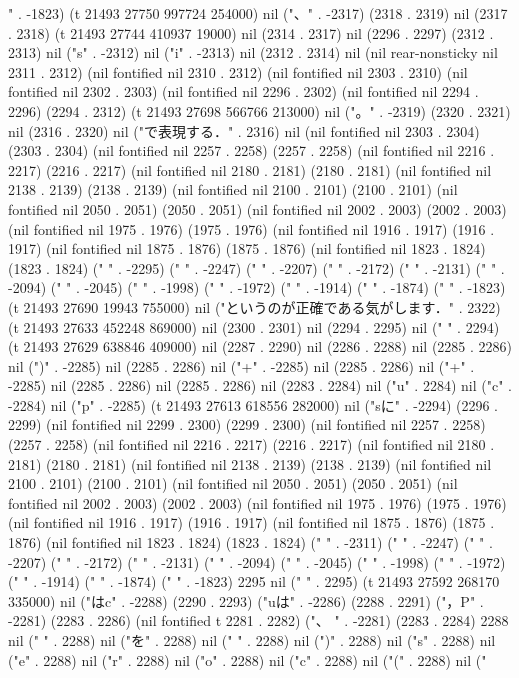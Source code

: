 " . -1823) (t 21493 27750 997724 254000) nil ("、" . -2317) (2318 . 2319) nil (2317 . 2318) (t 21493 27744 410937 19000) nil (2314 . 2317) nil (2296 . 2297) (2312 . 2313) nil ("s" . -2312) nil ("i" . -2313) nil (2312 . 2314) nil (nil rear-nonsticky nil 2311 . 2312) (nil fontified nil 2310 . 2312) (nil fontified nil 2303 . 2310) (nil fontified nil 2302 . 2303) (nil fontified nil 2296 . 2302) (nil fontified nil 2294 . 2296) (2294 . 2312) (t 21493 27698 566766 213000) nil ("。" . -2319) (2320 . 2321) nil (2316 . 2320) nil ("で表現する．" . 2316) nil (nil fontified nil 2303 . 2304) (2303 . 2304) (nil fontified nil 2257 . 2258) (2257 . 2258) (nil fontified nil 2216 . 2217) (2216 . 2217) (nil fontified nil 2180 . 2181) (2180 . 2181) (nil fontified nil 2138 . 2139) (2138 . 2139) (nil fontified nil 2100 . 2101) (2100 . 2101) (nil fontified nil 2050 . 2051) (2050 . 2051) (nil fontified nil 2002 . 2003) (2002 . 2003) (nil fontified nil 1975 . 1976) (1975 . 1976) (nil fontified nil 1916 . 1917) (1916 . 1917) (nil fontified nil 1875 . 1876) (1875 . 1876) (nil fontified nil 1823 . 1824) (1823 . 1824) ("
" . -2295) ("
" . -2247) ("
" . -2207) ("
" . -2172) ("
" . -2131) ("
" . -2094) ("
" . -2045) ("
" . -1998) ("
" . -1972) ("
" . -1914) ("
" . -1874) ("
" . -1823) (t 21493 27690 19943 755000) nil ("というのが正確である気がします．" . 2322) (t 21493 27633 452248 869000) nil (2300 . 2301) nil (2294 . 2295) nil (" " . 2294) (t 21493 27629 638846 409000) nil (2287 . 2290) nil (2286 . 2288) nil (2285 . 2286) nil (")" . -2285) nil (2285 . 2286) nil ("+" . -2285) nil (2285 . 2286) nil ("+" . -2285) nil (2285 . 2286) nil (2285 . 2286) nil (2283 . 2284) nil ("u" . 2284) nil ("c" . -2284) nil ("p" . -2285) (t 21493 27613 618556 282000) nil ("sに" . -2294) (2296 . 2299) (nil fontified nil 2299 . 2300) (2299 . 2300) (nil fontified nil 2257 . 2258) (2257 . 2258) (nil fontified nil 2216 . 2217) (2216 . 2217) (nil fontified nil 2180 . 2181) (2180 . 2181) (nil fontified nil 2138 . 2139) (2138 . 2139) (nil fontified nil 2100 . 2101) (2100 . 2101) (nil fontified nil 2050 . 2051) (2050 . 2051) (nil fontified nil 2002 . 2003) (2002 . 2003) (nil fontified nil 1975 . 1976) (1975 . 1976) (nil fontified nil 1916 . 1917) (1916 . 1917) (nil fontified nil 1875 . 1876) (1875 . 1876) (nil fontified nil 1823 . 1824) (1823 . 1824) ("
" . -2311) ("
" . -2247) ("
" . -2207) ("
" . -2172) ("
" . -2131) ("
" . -2094) ("
" . -2045) ("
" . -1998) ("
" . -1972) ("
" . -1914) ("
" . -1874) ("
" . -1823) 2295 nil (" " . 2295) (t 21493 27592 268170 335000) nil ("はc" . -2288) (2290 . 2293) ("uは" . -2286) (2288 . 2291) ("，P" . -2281) (2283 . 2286) (nil fontified t 2281 . 2282) ("、 " . -2281) (2283 . 2284) 2288 nil (" " . 2288) nil ("を" . 2288) nil (" " . 2288) nil (")" . 2288) nil ("s" . 2288) nil ("e" . 2288) nil ("r" . 2288) nil ("o" . 2288) nil ("c" . 2288) nil ("(" . 2288) nil ("
